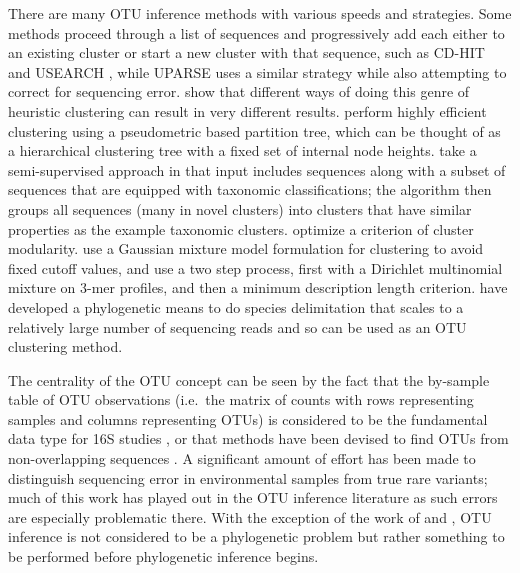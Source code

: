 \documentclass{amsart}
\begin{document}
There are many OTU inference methods with various speeds and strategies.
Some methods proceed through a list of sequences and progressively add each either to an existing cluster or start a new cluster with that sequence, such as CD-HIT \citep{li2006cdhit} and USEARCH \citep{edgar2010usearch}, while UPARSE \citep{edgar2013uparse} uses a similar strategy while also attempting to correct for sequencing error.
\citet{white2010alignment} show that different ways of doing this genre of heuristic clustering can result in very different results.
\citet{Cai2011-bi} perform highly efficient clustering using a pseudometric based partition tree, which can be thought of as a hierarchical clustering tree with a fixed set of internal node heights.
\citet{navlakha2009finding} take a semi-supervised approach in that input includes sequences along with a subset of sequences that are equipped with taxonomic classifications; the algorithm then groups all sequences (many in novel clusters) into clusters that have similar properties as the example taxonomic clusters.
\citet{Wang2013-ol} optimize a criterion of cluster modularity.
\citet{hao2011clustering} use a Gaussian mixture model formulation for clustering to avoid fixed cutoff values, and \citet{CWC12} use a two step process, first with a Dirichlet multinomial mixture on 3-mer profiles, and then a minimum description length criterion.
\citet{Zhang2013-wh} have developed a phylogenetic means to do species delimitation that scales to a relatively large number of sequencing reads and so can be used as an OTU clustering method.

The centrality of the OTU concept can be seen by the fact that the by-sample table of OTU observations (i.e.\ the matrix of counts with rows representing samples and columns representing OTUs) is considered to be the fundamental data type for 16S studies \citep{mcdonald2012biological}, or that methods have been devised to find OTUs from non-overlapping sequences \citep{sharpton2011phylotu}.
A significant amount of effort has been made to distinguish sequencing error in environmental samples from true rare variants; much of this work has played out in the OTU inference literature \citep{quince2009accurate,quince2011removing,bragg2012fast,edgar2013uparse} as such errors are especially problematic there.
With the exception of the work of \citet{sharpton2011phylotu} and \citet{Zhang2013-wh}, OTU inference is not considered to be a phylogenetic problem but rather something to be performed before phylogenetic inference begins.
\end{document}
